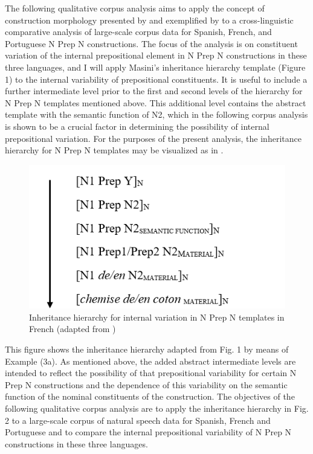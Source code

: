 \documentclass[output=paper]{langsci/langscibook}
\begin{document}
The following qualitative corpus analysis aims to apply the concept of construction morphology presented by \citet{Booij:2010,Booij:2015} and exemplified by \citet{Masini:2009} to a cross-linguistic comparative analysis of large-scale corpus data for Spanish, French, and Portuguese N Prep N constructions. The focus of the analysis is on constituent variation of the internal prepositional element in N Prep N constructions in these three languages, and I will apply Masini's inheritance hierarchy template (Figure 1) to the internal variability of prepositional constituents. It is useful to include a further intermediate level prior to the first and second levels of the hierarchy for N Prep N templates mentioned above. This additional level contains the abstract template with the semantic function of N2, which in the following corpus analysis is shown to be a crucial factor in determining the possibility of internal prepositional variation. For the purposes of the present analysis, the inheritance hierarchy for N Prep N templates may be visualized as in .

\begin{figure}
\caption{Inheritance hierarchy for internal variation in N Prep N templates in French (adapted from \citet{Masini:2009})\label{fig:henneke:Inheritancehierarchy}}
\includegraphics[scale=0.5]{figures/Inheritancehierarchy.png} 
\end{figure}

This figure shows the inheritance hierarchy adapted from Fig. 1 by means of Example (3a). As mentioned above, the added abstract intermediate levels are intended to reflect the possibility of that prepositional variability for certain N Prep N constructions and the dependence of this variability on the semantic function of the nominal constituents of the construction. The objectives of the following qualitative corpus analysis are to apply the inheritance hierarchy in Fig. 2 to a large-scale corpus of natural speech data for Spanish, French and Portuguese and to compare the internal prepositional variability of N Prep N constructions in these three languages.
\end{document}
